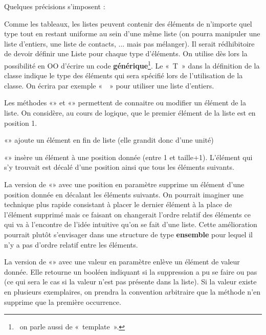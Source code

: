 \bigskip

Quelques précisions s’imposent :

\begin{liste}
	\item 
		Comme les tableaux, les listes peuvent contenir des éléments de
		n’importe quel type tout en restant uniforme au sein d’une même liste
		(on pourra manipuler une liste d’entiers, une liste de contacts, ...
		mais pas mélanger). Il serait rédhibitoire de devoir définir une Liste
		pour chaque type d’éléments. On utilise dès lors la possibilité en OO
		d’écrire un code \textbf{générique}\footnote{\ on parle aussi de
		«~template~».}. Le «~T~» dans la définition de la classe indique le
		type des éléments qui sera spécifié lors de l’utilisation de la classe.
		On écrira par exemple «~~» pour
		utiliser une liste d’entiers.
	\item 
		Les méthodes «» et «»
		permettent de connaitre ou modifier un élément de la liste. On
		considère, au cours de logique, que le premier élément de 
		la liste est en position 1.
	\item 
		«» ajoute un élément en fin de liste (elle
		grandit donc d’une unité)
	\item 
		«» insère un élément à une position donnée
		(entre 1 et taille+1). L’élément qui s’y trouvait est décalé
		d'une position ainsi que tous les éléments suivants.
	\item 
		La version de «» avec une position en
		paramètre supprime un élément d'une position donnée en
		décalant les éléments suivants. On pourrait imaginer une technique plus
		rapide consistant à placer le dernier élément à la place de l’élément
		supprimé mais ce faisant on changerait l’ordre relatif des éléments ce
		qui va à l’encontre de l’idée intuitive qu’on se fait d’une liste.
		Cette amélioration pourrait plutôt s’envisager dans une structure de
		type \textbf{ensemble} pour lequel il n’y a pas d’ordre relatif entre
		les éléments.
	\item 
		La version de «» avec une valeur en
		paramètre enlève un élément de valeur donnée. Elle retourne un booléen
		indiquant si la suppression a pu se faire ou pas (ce qui sera le cas si
		la valeur n’est pas présente dans la liste). Si la valeur existe en
		plusieurs exemplaires, on prendra la convention arbitraire que
		la méthode n’en supprime que la première	occurrence.
	\item 

\end{liste}
